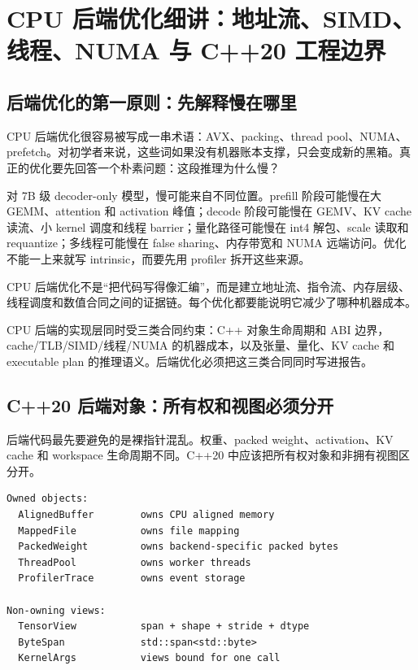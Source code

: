 \section{CPU 后端优化细讲：地址流、SIMD、线程、NUMA 与 C++20 工程边界}

\subsection{后端优化的第一原则：先解释慢在哪里}

CPU 后端优化很容易被写成一串术语：AVX、packing、thread pool、NUMA、prefetch。对初学者来说，这些词如果没有机器账本支撑，只会变成新的黑箱。真正的优化要先回答一个朴素问题：这段推理为什么慢？

对 7B 级 decoder-only 模型，慢可能来自不同位置。prefill 阶段可能慢在大 GEMM、attention 和 activation 峰值；decode 阶段可能慢在 GEMV、KV cache 读流、小 kernel 调度和线程 barrier；量化路径可能慢在 int4 解包、scale 读取和 requantize；多线程可能慢在 false sharing、内存带宽和 NUMA 远端访问。优化不能一上来就写 intrinsic，而要先用 profiler 拆开这些来源。

\begin{keyidea}
CPU 后端优化不是“把代码写得像汇编”，而是建立地址流、指令流、内存层级、线程调度和数值合同之间的证据链。每个优化都要能说明它减少了哪种机器成本。
\end{keyidea}

CPU 后端的实现层同时受三类合同约束：C++ 对象生命周期和 ABI 边界，cache/TLB/SIMD/线程/NUMA 的机器成本，以及张量、量化、KV cache 和 executable plan 的推理语义。后端优化必须把这三类合同同时写进报告。

\subsection{C++20 后端对象：所有权和视图必须分开}

后端代码最先要避免的是裸指针混乱。权重、packed weight、activation、KV cache 和 workspace 生命周期不同。C++20 中应该把所有权对象和非拥有视图区分开。

\begin{lstlisting}[numbers=none,caption={后端对象的所有权边界}]
Owned objects:
  AlignedBuffer        owns CPU aligned memory
  MappedFile           owns file mapping
  PackedWeight         owns backend-specific packed bytes
  ThreadPool           owns worker threads
  ProfilerTrace        owns event storage

Non-owning views:
  TensorView           span + shape + stride + dtype
  ByteSpan             std::span<std::byte>
  KernelArgs           views bound for one call
\end{lstlisting}


